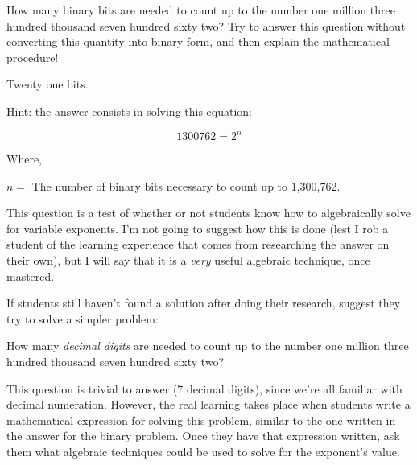 

How many binary bits are needed to count up to the number one million three hundred thousand seven hundred sixty two?  Try to answer this question without converting this quantity into binary form, and then explain the mathematical procedure!







Twenty one bits.

\vskip 10pt

Hint: the answer consists in solving this equation:

$$1300762 = 2^n$$

\noindent
Where,

$n =$ The number of binary bits necessary to count up to 1,300,762.







This question is a test of whether or not students know how to algebraically solve for variable exponents.  I'm not going to suggest how this is done (lest I rob a student of the learning experience that comes from researching the answer on their own), but I will say that it is a {\it very} useful algebraic technique, once mastered.

If students still haven't found a solution after doing their research, suggest they try to solve a simpler problem:

\vskip 10pt {\narrower \noindent \baselineskip5pt

How many {\it decimal digits} are needed to count up to the number one million three hundred thousand seven hundred sixty two?  

\par} \vskip 10pt

This question is trivial to answer (7 decimal digits), since we're all familiar with decimal numeration.  However, the real learning takes place when students write a mathematical expression for solving this problem, similar to the one written in the answer for the binary problem.  Once they have that expression written, ask them what algebraic techniques could be used to solve for the exponent's value.




